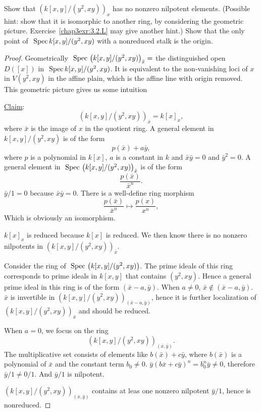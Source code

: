 \documentclass[11pt]{book} %
\begin{document}
\begin{exr}
Show that  $\left(k[x, y]/(y^2, xy)\right)_x$  has no nonzero nilpotent elements.
(Possible hint: show that it is isomorphic to another ring, by considering the geometric picture. Exercise~\ref{chap3exr:3.2.L} may give another hint.) Show that the only point of $\text{ Spec\,} k[x, y]/(y^2 , xy)$ with a nonreduced stalk is the origin.

\end{exr}
\begin{proof}
Geometrically $\text{ Spec\,} \left(k[x, y]/(y^2, xy)\right)_{\bar{x}}=$ the distinguished open $D([x])$ in $\text{ Spec\,} k[x, y]/(y^2, xy)$. It is equivalent to the non-vanishing loci of $x$ in $V(y^2,xy)$ in the affine plain, which is the affine line with origin removed. This geometric picture gives us some intuition

\underline{Claim}:
$$
\left(k[x, y]/(y^2, xy)\right)_{\bar{x}}=k[x]_{x},
$$
where $\bar{x}$ is the image of $x$ in the quotient ring. A general element in $k[x, y]/(y^2, xy)$ is of the form
$$
p(\bar{x})+a\bar{y},
$$
where $p$ is a polynomial in $k[x]$, $a$ is a constant in $k$ and $\bar{x}\bar{y}=0$ and $\bar{y}^2=0$.
A general element in $\text{ Spec\,} \left(k[x, y]/(y^2, xy)\right)_{\bar{x}}$ is of the form
$$
\frac{p(\bar{x})}{\bar{x}^n}.
$$
$\bar{y}/1=0$ because $\bar{x}\bar{y}=0$.
 There is a well-define ring morphism
$$
\frac{p(\bar{x})}{\bar{x}^n}\mapsto \frac{p(x)}{x^n},
$$
Which is obviously an isomorphism.

$k[x]_x$ is reduced because $k[x]$ is reduced. We then know there is no nonzero nilpotents in $\left(k[x, y]/(y^2, xy)\right)_{\bar{x}}$.

Consider the ring of $\text{ Spec\,} \left(k[x, y]/(y^2, xy)\right)$. The prime ideals of this ring corresponds to prime ideals in $k[x,y]$ that contains $(y^2,xy)$. Hence a general prime ideal in this ring is of the form $(\bar{x}-a, \bar{y})$. 
When $a\neq 0$, $\bar{x}\notin (\bar{x}-a,\bar{y})$. $\bar{x}$ is invertible in $\left(k[x, y]/(y^2, xy)\right)_{(\bar{x}-a,\bar{y})}$, hence it is further localization of $\left(k[x, y]/(y^2, xy)\right)_{\bar{x}}$ and should be reduced.

When $a=0$, we focus on the ring
$$
\left(k[x, y]/(y^2, xy)\right)_{(\bar{x},\bar{y})}.
$$
The multiplicative set consists of elements like $b(\bar{x})+c\bar{y}$, where $b(\bar{x})$ is a polynomial of $\bar{x}$ and the constant term $b_0\neq 0$. $\bar{y}(b\bar{x}+c\bar{y})^n=b_0^n\bar{y}\neq 0$, therefore $\bar{y}/1\neq 0/1$. And $\bar{y}/1$ is nilpotent.

$\left(k[x, y]/(y^2, xy)\right)_{(\bar{x},\bar{y})}$ contains at leas one nonzero nilpotent $\bar{y}/1$, hence is nonreduced.
\end{proof}
\end{document}
